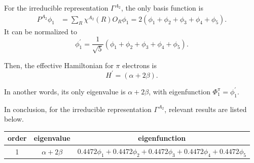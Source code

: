 \documentclass[a4paper]{book}
\begin{document}
\begin{solution}
\begin{enumerate}[label=(\alph*)]
		For the irreducible representation $\Gamma^{A_2}$, the only basis function is
		\begin{align*}
			P^{A_2}\phi_1 &= \sum_{R} \chi^{A_2}(R) O_R \phi_1 = 2(\phi_1 + \phi_2 + \phi_3 + \phi_4 + \phi_5).
		\end{align*}
		It can be normalized to
		\begin{equation}
			\phi^\prime_1 = \frac{1}{\sqrt{5}}(\phi_1 + \phi_2 + \phi_3 + \phi_4 + \phi_5).
		\end{equation}
		
		Then, the effective Hamiltonian for $\pi$ electrons is
		\begin{equation*}
			H^\prime = ( \alpha + 2\beta ).		
		\end{equation*}
		
		In another words, its only eigenvalue is $\alpha + 2\beta$, with eigenfunction $\Phi^\pi_1 = \phi^\prime_1$.
		
		In conclusion, for the irreducible representation $\Gamma^{A_2}$, relevant results are listed below.
		
		\begin{center}
		\setlength{\abovecaptionskip}{0em}
		\begin{tabular}{ccc}\hline
		  order	&	eigenvalue		& 	eigenfunction	\\ \hline
			1	&$\alpha+2\beta$& 	$0.4472\phi_1 + 0.4472 \phi_2 + 0.4472 \phi_3 + 0.4472 \phi_4 + 0.4472 \phi_5$ \\ \hline
		\end{tabular}
		\end{center}
		

\end{enumerate}
\end{solution}
\end{document}
